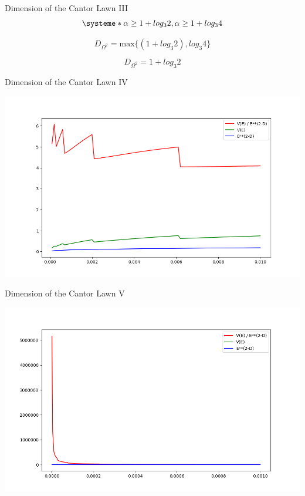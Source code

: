 \documentclass{if-beamer}
\newcommand{\Om}{\Omega}
\begin{document}
\begin{frame}{Dimension of the Cantor Lawn III}
\[ 
\systeme*{\alpha \geq 1 + log_3 2, \alpha \geq 1 + log_3 4}
\]
\pause

\[ 
D_{\Om^2} = \text{max} \{ (1 + log_3 2), log_3 4 \}
\]
\pause

\[ 
D_{\Om^2} = 1 + log_3 2
\]
\end{frame}

\begin{frame}{Dimension of the Cantor Lawn IV}
	\begin{center}
		\includegraphics[scale=0.40]{CantorLawnVolumesPlot.png}
	\end{center}
\end{frame}

\begin{frame}{Dimension of the Cantor Lawn V}
	\begin{center}
		\includegraphics[scale=0.40]{CantorLawnVolumePlot_Alpha-1.png}
	\end{center}
\end{frame}
\end{document}
